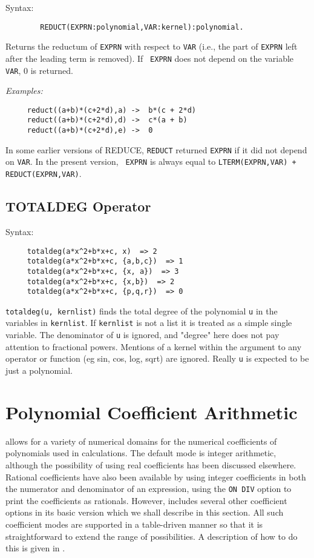 Syntax:
\begin{verbatim}
        REDUCT(EXPRN:polynomial,VAR:kernel):polynomial.
\end{verbatim}
Returns the reductum of \texttt{EXPRN} with respect to \texttt{VAR} (i.e., the
part of \texttt{EXPRN} left after the leading term is removed).  If {\tt
EXPRN} does not depend on the variable \texttt{VAR}, 0 is returned.

\textit{Examples:}
\begin{verbatim}
     reduct((a+b)*(c+2*d),a) ->  b*(c + 2*d)
     reduct((a+b)*(c+2*d),d) ->  c*(a + b)
     reduct((a+b)*(c+2*d),e) ->  0
\end{verbatim}

{\COMPATNOTE} In some earlier versions of REDUCE, \texttt{REDUCT} returned
\texttt{EXPRN} if it did not depend on \texttt{VAR}.  In the present version, {\tt
EXPRN} is always equal to \texttt{LTERM(EXPRN,VAR) + REDUCT(EXPRN,VAR)}.

\subsection{TOTALDEG Operator}
\hypertarget{operator:TOTALDEG}{}

Syntax:
\begin{verbatim}
     totaldeg(a*x^2+b*x+c, x)  => 2
     totaldeg(a*x^2+b*x+c, {a,b,c})  => 1
     totaldeg(a*x^2+b*x+c, {x, a})  => 3
     totaldeg(a*x^2+b*x+c, {x,b})  => 2
     totaldeg(a*x^2+b*x+c, {p,q,r})  => 0
\end{verbatim}
\texttt{totaldeg(u, kernlist)} finds the total degree of the polynomial \texttt{u} in
the variables in \texttt{kernlist}. If \texttt{kernlist} is not a list it is treated
as a simple single variable.
The denominator of \texttt{u} is ignored, and "degree" here does not pay attention
to fractional powers. Mentions of a kernel within the argument to any
operator or function (eg sin, cos, log, sqrt) are ignored. Really \texttt{u} is
expected to be just a polynomial.

\section{Polynomial Coefficient Arithmetic}
{\REDUCE} allows for a variety of numerical domains for the numerical
coefficients of polynomials used in calculations.  The default mode is
integer arithmetic, although the possibility of using real coefficients
 has been discussed elsewhere.  Rational
coefficients have also been available by using integer coefficients in
both the numerator and denominator of an expression, using the 
\texttt{ON DIV} option to print the coefficients as rationals.
However, {\REDUCE} includes several other coefficient options in its basic
version which we shall describe in this section.  All such coefficient
modes are supported in a table-driven manner so that it is
straightforward to extend the range of possibilities.  A description of
how to do this is given in \cite{Bradford:86}.

